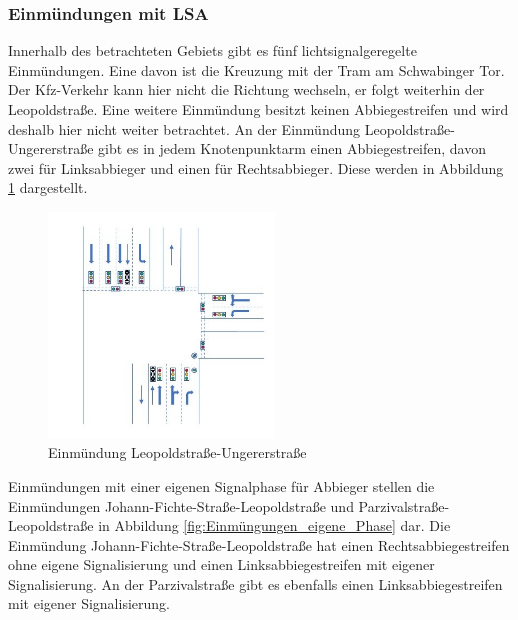 \subsubsection{Einmündungen mit LSA}
Innerhalb des betrachteten Gebiets gibt es fünf lichtsignalgeregelte Einmündungen. Eine davon ist die Kreuzung mit der Tram am Schwabinger Tor. Der Kfz-Verkehr kann hier nicht die Richtung wechseln, er folgt weiterhin der Leopoldstraße. Eine weitere Einmündung besitzt keinen Abbiegestreifen und wird deshalb hier nicht weiter betrachtet. An der Einmündung Leopoldstraße-Ungererstraße gibt es in jedem Knotenpunktarm einen Abbiegestreifen, davon zwei für Linksabbieger und einen für Rechtsabbieger. Diese werden in Abbildung \ref{fig:Einmüngung_Abbiegestreifen} dargestellt.

\begin{savenotes}
	\begin{figure}[H]
		\centering
		\includegraphics[width=6cm,height=6cm]{figures/Einmuendung_Abbiegestreifen}
		\caption[Einmündung Leopoldstraaße-Ungererstraße]{Einmündung Leopoldstraße-Ungererstraße \parencite{Kutsch.05.04.2018}}\label{fig:Einmüngung_Abbiegestreifen}
	\end{figure}
\end{savenotes}

Einmündungen mit einer eigenen Signalphase für Abbieger stellen die Einmündungen Johann-Fichte-Straße-Leopoldstraße und Parzivalstraße-Leopoldstraße in Abbildung \ref{fig:Einmüngungen_eigene_Phase} dar. Die Einmündung Johann-Fichte-Straße-Leopoldstraße hat einen Rechtsabbiegestreifen ohne eigene Signalisierung und einen Linksabbiegestreifen mit eigener Signalisierung. An der Parzivalstraße gibt es ebenfalls einen Linksabbiegestreifen mit eigener Signalisierung.  

